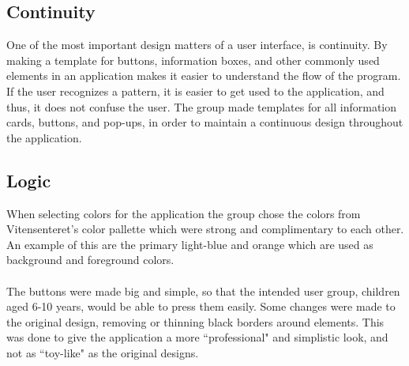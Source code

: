 \subsection{Continuity} One of the most important design matters of a user interface, is continuity. By making a template for buttons, information boxes, and other commonly used elements in an application makes it easier to understand the flow of the program. If the user recognizes a pattern, it is easier to get used to the application, and thus, it does not confuse the user. The group made templates for all information cards, buttons, and pop-ups, in order to maintain a continuous design throughout the application.


\subsection{Logic}
When selecting colors for the application the group chose the colors from Vitensenteret's color pallette which were strong and complimentary to each other. An example of this are the primary light-blue and orange which are used as background and foreground colors.\\\\
The buttons were made big and simple, so that the intended user group, children aged 6-10 years, would be able to press them easily. Some changes were made to the original design, removing or thinning black borders around elements. This was done to give the application a more ``professional" and simplistic look, and not as ``toy-like" as the original designs.
